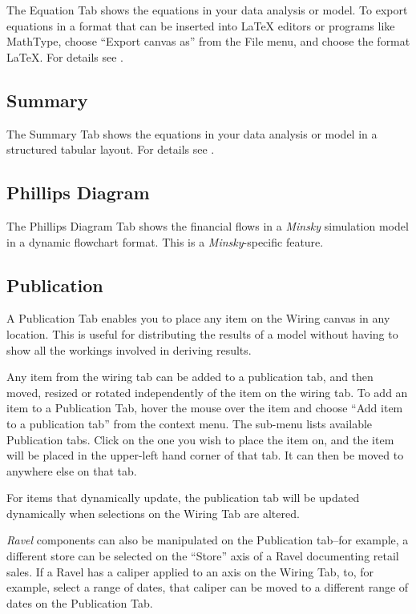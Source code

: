 The Equation Tab shows the equations in your data analysis or model.
To export equations in a format that can be inserted into \LaTeX{} editors
or programs like MathType, choose ``Export canvas as'' from the
File menu, and choose the format LaTeX. For details see .

\subsection{Summary}

The Summary Tab shows the equations in your data analysis or model
in a structured tabular layout. For details see .

\subsection{Phillips Diagram}

The Phillips Diagram Tab shows the financial flows in a \emph{Minsky}
simulation model in a dynamic flowchart format. This is a \emph{Minsky}-specific
feature.

\subsection{Publication }

\label{tabs:Publication}

A Publication Tab enables you to place any item on the Wiring canvas
in any location. This is useful for distributing the results of a
model without having to show all the workings involved in deriving
results.

Any item from the wiring tab can be added to a publication tab, and
then moved, resized or rotated independently of the item on the wiring
tab. To add an item to a Publication Tab, hover the mouse over the
item and choose ``Add item to a publication tab'' from the context
menu. The sub-menu lists available Publication tabs. Click on the
one you wish to place the item on, and the item will be placed in
the upper-left hand corner of that tab. It can then be moved to anywhere
else on that tab.

For items that dynamically update, the publication tab will be updated
dynamically when selections on the Wiring Tab are altered.

\emph{Ravel} components can also be manipulated on the Publication
tab--for example, a different store can be selected on the ``Store''
axis of a Ravel documenting retail sales. If a Ravel has a caliper
applied to an axis on the Wiring Tab, to, for example, select a range
of dates, that caliper can be moved to a different range of dates
on the Publication Tab.

